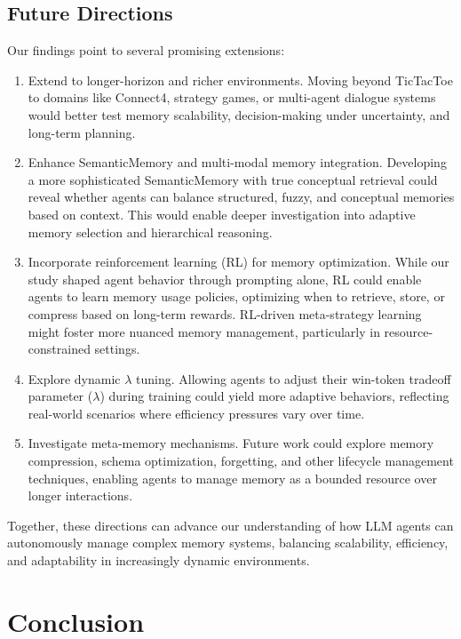 \documentclass[10pt]{article}
\begin{document}
\subsection{Future Directions}

Our findings point to several promising extensions:
\begin{enumerate}
    \item Extend to longer-horizon and richer environments. Moving beyond TicTacToe to domains like Connect4, strategy games, or multi-agent dialogue systems would better test memory scalability, decision-making under uncertainty, and long-term planning.
    
    \item Enhance SemanticMemory and multi-modal memory integration. Developing a more sophisticated SemanticMemory with true conceptual retrieval could reveal whether agents can balance structured, fuzzy, and conceptual memories based on context. This would enable deeper investigation into adaptive memory selection and hierarchical reasoning.
    
    \item Incorporate reinforcement learning (RL) for memory optimization. While our study shaped agent behavior through prompting alone, RL could enable agents to learn memory usage policies, optimizing when to retrieve, store, or compress based on long-term rewards. RL-driven meta-strategy learning might foster more nuanced memory management, particularly in resource-constrained settings.
    
    \item Explore dynamic $\lambda$ tuning. Allowing agents to adjust their win-token tradeoff parameter ($\lambda$) during training could yield more adaptive behaviors, reflecting real-world scenarios where efficiency pressures vary over time.
    
    \item Investigate meta-memory mechanisms. Future work could explore memory compression, schema optimization, forgetting, and other lifecycle management techniques, enabling agents to manage memory as a bounded resource over longer interactions.
\end{enumerate}

Together, these directions can advance our understanding of how LLM agents can autonomously manage complex memory systems, balancing scalability, efficiency, and adaptability in increasingly dynamic environments.

\section{Conclusion}
\end{document}
